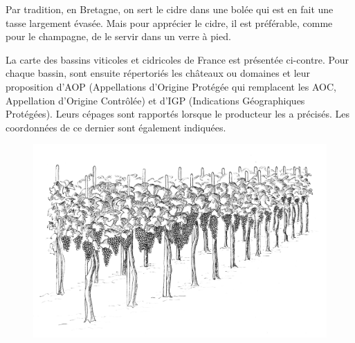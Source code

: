 Par tradition, en Bretagne, on sert le cidre dans une bolée qui est en fait une tasse largement évasée. Mais pour apprécier le cidre, il est préférable, comme pour le champagne, de le servir dans un verre à pied.
  
La carte des bassins viticoles et cidricoles de France est présentée ci-contre.
Pour chaque bassin, sont ensuite répertoriés les châteaux ou domaines et leur proposition d’AOP (Appellations d’Origine Protégée qui remplacent les AOC, Appellation d’Origine Contrôlée) et d’IGP (Indications Géographiques Protégées). Leurs cépages sont rapportés lorsque le producteur les a précisés. Les coordonnées de ce dernier sont également indiquées.   
\vskip 32mm
\begin{figure}[!h]
\begin{center}
\includegraphics[width=.8\textwidth]{./SuppImg/vigne.png}
\end{center}
\end{figure}
